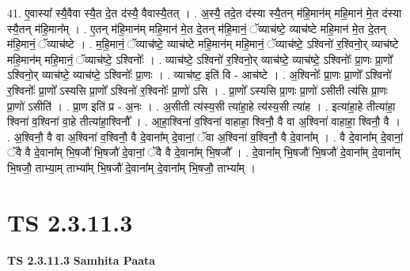 \documentclass[17pt]{extarticle}
\begin{document}
41. ए॒वास्या᳚ स्यै॒वैवा स्यै॒त दे॒त द॑स्यै॒ वैवास्यै॒तत् । . अ॒स्यै॒ तदे॒त द॑स्या स्यै॒तन् म॑हि॒मान॑म् महि॒मान॑ मे॒त द॑स्या स्यै॒तन् म॑हि॒मान᳚म् । . ए॒तन् म॑हि॒मान॑म् महि॒मान॑ मे॒त दे॒तन् म॑हि॒मानं॒ ॅव्याच॑ष्टे॒ व्याच॑ष्टे महि॒मान॑ मे॒त दे॒तन् म॑हि॒मानं॒ ॅव्याच॑ष्टे । . म॒हि॒मानं॒ ॅव्याच॑ष्टे॒ व्याच॑ष्टे महि॒मान॑म् महि॒मानं॒ ॅव्याच॑ष्टे॒ ऽश्विनो॑ र॒श्विनो॒र् व्याच॑ष्टे महि॒मान॑म् महि॒मानं॒ ॅव्याच॑ष्टे॒ ऽश्विनोः᳚ । . व्याच॑ष्टे॒ ऽश्विनो॑ र॒श्विनो॒र् व्याच॑ष्टे॒ व्याच॑ष्टे॒ ऽश्विनोः᳚ प्रा॒णः प्रा॒णो᳚ ऽश्विनो॒र् व्याच॑ष्टे॒ व्याच॑ष्टे॒ ऽश्विनोः᳚ प्रा॒णः । . व्याच॑ष्ट॒ इति॑ वि - आच॑ष्टे । . अ॒श्विनोः᳚ प्रा॒णः प्रा॒णो᳚ ऽश्विनो॑ र॒श्विनोः᳚ प्रा॒णो᳚ ऽस्यसि प्रा॒णो᳚ ऽश्विनो॑ र॒श्विनोः᳚ प्रा॒णो॑ ऽसि । . प्रा॒णो᳚ ऽस्यसि प्रा॒णः प्रा॒णो॑ ऽसीती त्य॑सि प्रा॒णः प्रा॒णो॑ ऽसीति॑ । . प्रा॒ण इति॑ प्र - अ॒नः । . अ॒सीती त्य॑स्य॒सी त्या॑हा॒हे त्य॑स्य॒सी त्या॑ह । . इत्या॑हा॒हे तीत्या॑हा॒ श्विना॑ व॒श्विना॑ वा॒हे तीत्या॑हा॒श्विनौ᳚ । . आ॒हा॒श्विना॑ व॒श्विना॑ वाहाहा॒ श्विनौ॒ वै वा अ॒श्विना॑ वाहाहा॒ श्विनौ॒ वै । . अ॒श्विनौ॒ वै वा अ॒श्विना॑ व॒श्विनौ॒ वै दे॒वाना᳚म् दे॒वानां॒ ॅवा अ॒श्विना॑ व॒श्विनौ॒ वै दे॒वाना᳚म् । . वै दे॒वाना᳚म् दे॒वानां॒ ॅवै वै दे॒वाना᳚म् भि॒षजौ॑ भि॒षजौ॑ दे॒वानां॒ ॅवै वै दे॒वाना᳚म् भि॒षजौ᳚ । . दे॒वाना᳚म् भि॒षजौ॑ भि॒षजौ॑ दे॒वाना᳚म् दे॒वाना᳚म् भि॒षजौ॒ ताभ्या॒म् ताभ्या᳚म् भि॒षजौ॑ दे॒वाना᳚म् दे॒वाना᳚म् भि॒षजौ॒ ताभ्या᳚म् । \newline
\pagebreak
{}

\section{ TS 2.3.11.3 }

\textbf{TS 2.3.11.3 } \newline
\textbf{Samhita Paata} \newline
\end{document}
